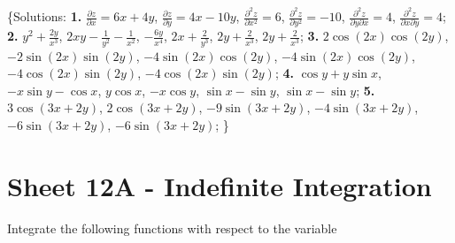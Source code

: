 \documentclass[
  english,
  11pt,
  oneside]{book}
\newcommand{\slide}{}
\theoremstyle{definition}
\theoremstyle{definition}
\theoremstyle{definition}
\theoremstyle{definition}
\theoremstyle{remark}
\begin{document}
\{Solutions:
\textbf{1.} \(\frac{\partial z}{\partial x}=6x+4y\), \(\frac{\partial z}{\partial y}=4 x - 10 y\), \(\frac{\partial^2 z}{\partial x^2}=6\), \(\frac{\partial^2 z}{\partial y^2}=-10\), \(\frac{\partial^2 z}{\partial y\partial x}=4\), \(\frac{\partial^2 z}{\partial x\partial y}=4\);
\textbf{2.} \(y^2+{\frac{2y}{x^3}}\), \(2xy-{\frac{1}{y^2}}-{\frac{1}{x^2}}\), \(-{\frac{6y}{x^4}}\), \(2x+{\frac{2}{y^3}}\), \(2y+{\frac{2}{x^3}}\), \(2y+{\frac{2}{x^3}}\);
\textbf{3.} \(2\cos \left(2x\right)\cos \left(2y\right)\), \(-2\sin \left(2x\right)\sin \left(2y\right)\), \(-4\sin \left(2x\right)\cos \left(2y\right)\), \(-4\sin \left(2x\right)\cos \left(2y\right)\), \(-4\cos \left(2x\right)\sin \left(2y\right)\), \(-4\cos \left(2x\right)\sin \left(2y\right)\);
\textbf{4.} \(\cos y+y\sin x\), \(-x\sin y-\cos x\), \(y\cos x\), \(-x\cos y\), \(\sin x-\sin y\), \(\sin x-\sin y\);
\textbf{5.} \(3\cos \left(3x+2y\right)\), \(2\cos \left(3x+2y\right)\), \(-9\sin \left(3x+2y\right)\), \(-4\sin \left(3x+2y\right)\), \(-6\sin \left(3x+2y\right)\), \(-6\sin \left(3x+2y\right)\);
\}

\slide

\section{Sheet 12A - Indefinite Integration}\label{sheet-12a---indefinite-integration}

Integrate the following functions with respect to the variable
\end{document}
